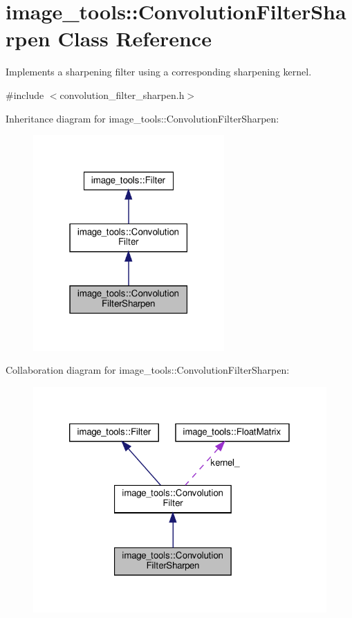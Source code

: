 \hypertarget{classimage__tools_1_1ConvolutionFilterSharpen}{}\section{image\+\_\+tools\+:\+:Convolution\+Filter\+Sharpen Class Reference}
\label{classimage__tools_1_1ConvolutionFilterSharpen}


Implements a sharpening filter using a corresponding sharpening kernel.  




{\ttfamily \#include $<$convolution\+\_\+filter\+\_\+sharpen.\+h$>$}



Inheritance diagram for image\+\_\+tools\+:\+:Convolution\+Filter\+Sharpen\+:
\nopagebreak
\begin{figure}[H]
\begin{center}
\leavevmode
\includegraphics[width=207pt]{classimage__tools_1_1ConvolutionFilterSharpen__inherit__graph}
\end{center}
\end{figure}


Collaboration diagram for image\+\_\+tools\+:\+:Convolution\+Filter\+Sharpen\+:
\nopagebreak
\begin{figure}[H]
\begin{center}
\leavevmode
\includegraphics[width=320pt]{classimage__tools_1_1ConvolutionFilterSharpen__coll__graph}
\end{center}
\end{figure}
